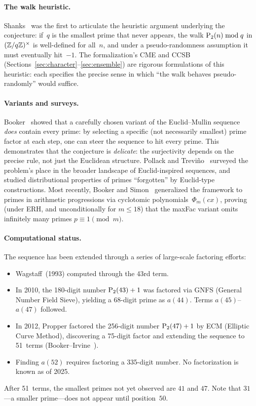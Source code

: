 \paragraph{The walk heuristic.}
Shanks~\cite{Shanks1991} was the first to articulate the heuristic
argument underlying the conjecture: if~$q$ is the smallest prime that
never appears, the walk $\mathrm{P}_{2}(n) \bmod q$ in $(\mathbb{Z}/q\mathbb{Z})^\times$
is well-defined for all~$n$, and under a pseudo-randomness assumption
it must eventually hit~$-1$.  The formalization's CME and CCSB
(Sections~\ref{sec:character}--\ref{sec:ensemble}) are rigorous
formulations of this heuristic: each specifies the precise sense in
which ``the walk behaves pseudo-randomly'' would suffice.

\paragraph{Variants and surveys.}
Booker~\cite{BoSa2012} showed that a carefully chosen variant of the
Euclid--Mullin sequence \emph{does} contain every prime: by selecting a
specific (not necessarily smallest) prime factor at each step, one can
steer the sequence to hit every prime.  This demonstrates that the
conjecture is \emph{delicate}: the surjectivity depends on the precise
rule, not just the Euclidean structure.  Pollack and
Trevi\~{n}o~\cite{PollackTrevino2014} surveyed the problem's place in
the broader landscape of Euclid-inspired sequences, and studied
distributional properties of primes ``forgotten'' by Euclid-type
constructions.  Most recently, Booker and
Simon~\cite{BoSi2026} generalized the framework to primes in
arithmetic progressions via cyclotomic polynomials~$\Phi_m(cx)$,
proving (under ERH, and unconditionally for $m \leq 18$) that the
maxFac variant omits infinitely many primes $p \equiv 1 \pmod{m}$.

\paragraph{Computational status.}
The sequence has been extended through a series of large-scale
factoring efforts:
\begin{itemize}[nosep]
\item Wagstaff~(1993) computed through the 43rd term.
\item In 2010, the 180-digit number $\mathrm{P}_{2}(43) + 1$ was factored via
  GNFS (General Number Field Sieve), yielding a 68-digit prime as
  $a(44)$.  Terms $a(45)$--$a(47)$ followed.
\item In 2012, Propper factored the 256-digit number $\mathrm{P}_{2}(47)+1$ by
  ECM (Elliptic Curve Method), discovering a 75-digit factor and
  extending the sequence to 51~terms
  (Booker--Irvine~\cite{BoIr2016}).
\item Finding $a(52)$ requires factoring a 335-digit number.  No
  factorization is known as of 2025.
\end{itemize}
After 51~terms, the smallest primes not yet observed are $41$ and $47$.
Note that $31$---a smaller prime---does not appear until position~$50$.


